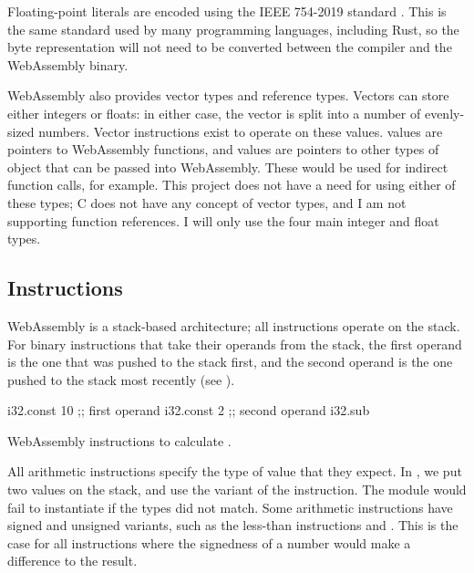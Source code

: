 \documentclass[00-main.tex]{subfiles}
\begin{document}
Floating-point literals are encoded using the IEEE 754-2019 standard .
This is the same standard used by many programming languages, including Rust, so the byte representation will not need to be converted between the compiler and the WebAssembly binary.

WebAssembly also provides vector types and reference types.
Vectors can store either integers or floats: in either case, the vector is split into a number of evenly-sized numbers.
Vector instructions exist to operate on these values.
 values are pointers to WebAssembly functions, and  values are pointers to other types of object that can be passed into WebAssembly. These would be used for indirect function calls, for example.
This project does not have a need for using either of these types; C does not have any concept of vector types, and I am not supporting function references.
I will only use the four main integer and float types.

\subsection{Instructions}

WebAssembly is a stack-based architecture; all instructions operate on the stack.
For binary instructions that take their operands from the stack, the first operand is the one that was pushed to the stack first, and the second operand is the one pushed to the stack most recently (see ).

\begin{listing}[ht]
  \begin{WasmListing}
    i32.const 10 ;; first operand
    i32.const 2  ;; second operand
    i32.sub
  \end{WasmListing}
  \caption{WebAssembly instructions to calculate .}
  \label{lst:wasm example sub instr}
\end{listing}

All arithmetic instructions specify the type of value that they expect. In , we put two  values on the stack, and use the  variant of the  instruction.
The module would fail to instantiate if the types did not match.
Some arithmetic instructions have signed and unsigned variants, such as the less-than instructions  and .
This is the case for all instructions where the signedness of a number would make a difference to the result.
\end{document}
